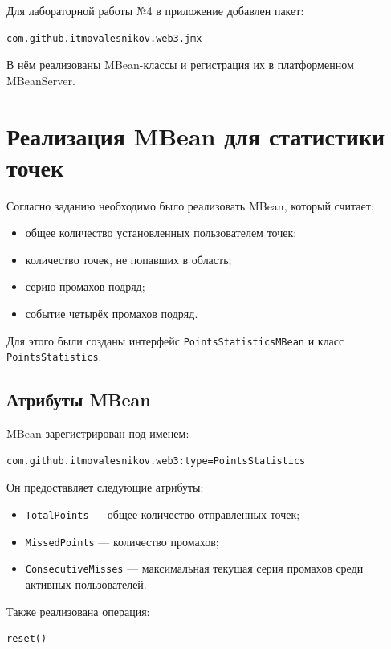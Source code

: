 \documentclass[a4paper,11pt]{article}
\begin{document}
Для лабораторной работы №4 в приложение добавлен пакет:

\begin{lstlisting}
com.github.itmovalesnikov.web3.jmx
\end{lstlisting}

В нём реализованы MBean-классы и регистрация их в платформенном MBeanServer.

\section{Реализация MBean для статистики точек}

Согласно заданию необходимо было реализовать MBean, который считает:
\begin{itemize}
    \item общее количество установленных пользователем точек;
    \item количество точек, не попавших в область;
    \item серию промахов подряд;
    \item событие четырёх промахов подряд.
\end{itemize}

Для этого были созданы интерфейс \texttt{PointsStatisticsMBean} и класс \texttt{PointsStatistics}.

\subsection{Атрибуты MBean}

MBean зарегистрирован под именем:

\begin{lstlisting}
com.github.itmovalesnikov.web3:type=PointsStatistics
\end{lstlisting}

Он предоставляет следующие атрибуты:

\begin{itemize}
    \item \texttt{TotalPoints} --- общее количество отправленных точек;
    \item \texttt{MissedPoints} --- количество промахов;
    \item \texttt{ConsecutiveMisses} --- максимальная текущая серия промахов среди активных пользователей.
\end{itemize}

Также реализована операция:

\begin{lstlisting}
reset()
\end{lstlisting}
\end{document}

